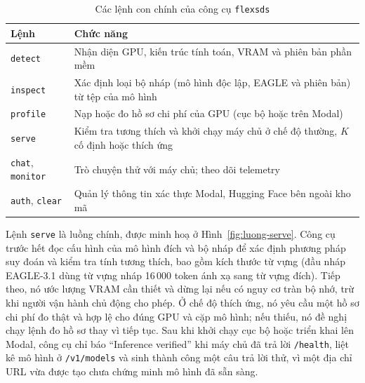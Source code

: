 \begin{table}[htbp]
\centering
\caption{Các lệnh con chính của công cụ \texttt{flexsds}}
\label{tab:cli}
\small
\begin{tabularx}{\linewidth}{@{}>{\raggedright\arraybackslash}p{26mm}>{\raggedright\arraybackslash}X@{}}
\toprule
\textbf{Lệnh} & \textbf{Chức năng} \\
\midrule
\texttt{detect} & Nhận diện GPU, kiến trúc tính toán, VRAM và phiên bản phần mềm \\
\texttt{inspect} & Xác định loại bộ nháp (mô hình độc lập, EAGLE và phiên bản) từ tệp của mô hình \\
\texttt{profile} & Nạp hoặc đo hồ sơ chi phí của GPU (cục bộ hoặc trên Modal) \\
\texttt{serve} & Kiểm tra tương thích và khởi chạy máy chủ ở chế độ thường, $K$ cố định hoặc thích ứng \\
\texttt{chat}, \texttt{monitor} & Trò chuyện thử với máy chủ; theo dõi telemetry \\
\texttt{auth}, \texttt{clear} & Quản lý thông tin xác thực Modal, Hugging Face bên ngoài kho mã \\
\bottomrule
\end{tabularx}
\end{table}

Lệnh \texttt{serve} là luồng chính, được minh hoạ ở Hình~\ref{fig:luong-serve}. Công cụ trước hết đọc cấu hình của mô hình đích và bộ nháp để xác định phương pháp suy đoán và kiểm tra tính tương thích, bao gồm kích thước từ vựng (đầu nháp EAGLE-3.1 dùng từ vựng nháp 16\,000 token ánh xạ sang từ vựng đích). Tiếp theo, nó ước lượng VRAM cần thiết và dừng lại nếu có nguy cơ tràn bộ nhớ, trừ khi người vận hành chủ động cho phép. Ở chế độ thích ứng, nó yêu cầu một hồ sơ chi phí đo thật và hợp lệ cho đúng GPU và cặp mô hình; nếu thiếu, nó đề nghị chạy lệnh đo hồ sơ thay vì tiếp tục. Sau khi khởi chạy cục bộ hoặc triển khai lên Modal, công cụ chỉ báo ``Inference verified'' khi máy chủ đã trả lời \texttt{/health}, liệt kê mô hình ở \texttt{/v1/models} và sinh thành công một câu trả lời thử, vì một địa chỉ URL vừa được tạo chưa chứng minh mô hình đã sẵn sàng.

